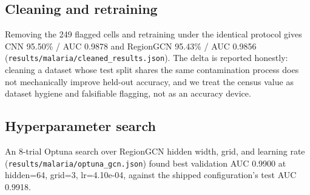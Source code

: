 \subsection{Cleaning and retraining}
Removing the 249 flagged cells and retraining under the identical
protocol gives CNN 95.50\% / AUC
0.9878 and RegionGCN 95.43\% /
AUC 0.9856 (\texttt{results/malaria/cleaned\_results.json}).
The delta is reported honestly: cleaning a dataset whose test split shares
the same contamination process does not mechanically improve held-out
accuracy, and we treat the census value as dataset hygiene and falsifiable
flagging, not as an accuracy device.
\subsection{Hyperparameter search}
An 8-trial Optuna search over RegionGCN hidden width, grid, and learning
rate (\texttt{results/malaria/optuna\_gcn.json}) found best validation AUC
0.9900 at hidden=64,
grid=3, lr=4.10e-04, against
the shipped configuration's test AUC 0.9918.
